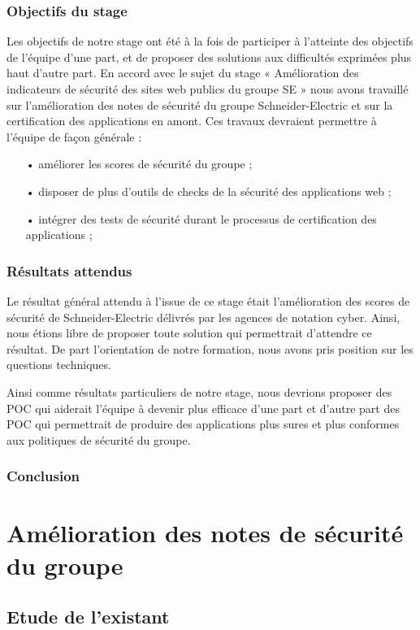 \documentclass[a4paper,12pt]{book}
\theoremstyle{break}
\begin{document}
\section{Objectifs du stage}
Les objectifs de notre stage ont été à la fois de participer à l’atteinte des objectifs de l’équipe d’une part, et de proposer des solutions aux difficultés exprimées plus haut d’autre part. En accord avec le sujet du stage « Amélioration des indicateurs de sécurité des sites web publics du groupe SE » nous avons travaillé sur l’amélioration des notes de sécurité du groupe Schneider-Electric et sur la certification des applications en amont. 
Ces travaux devraient permettre à l’équipe de façon générale : 
\begin{itemize}
    \item[•] améliorer les scores de sécurité du groupe ;
    \item[•] disposer de plus d’outils de checks de la sécurité des applications web ;
    \item[•] intégrer des tests de sécurité durant le processus de certification des applications ;
\end{itemize}

\section{Résultats attendus}
Le résultat général attendu à l'issue de ce stage était l'amélioration des scores de sécurité de Schneider-Electric délivrés par les agences de notation cyber.
Ainsi, nous étions libre de proposer toute solution qui permettrait d'attendre ce résultat. 
De part l'orientation de notre formation, nous avons pris position sur les questions techniques. 

Ainsi comme résultats particuliers de notre stage, nous devrions proposer des POC  qui aiderait l'équipe à devenir plus efficace d'une part et d'autre part des POC qui permettrait de produire des applications plus sures et plus conformes aux politiques de sécurité du groupe.

\section*{Conclusion}

\part{Amélioration des notes de sécurité du groupe}

\chapter{Etude de l'existant}
\end{document}
